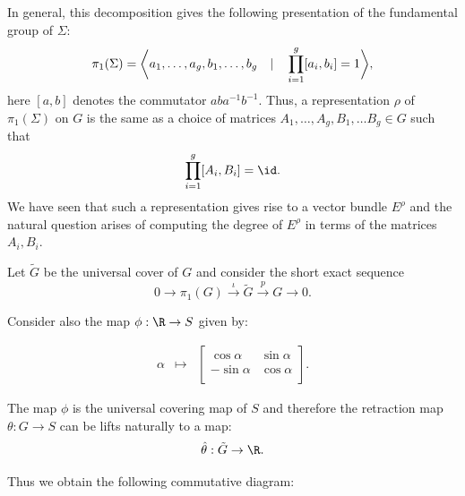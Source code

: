 In general, this decomposition gives the following presentation of the fundamental group of $\Sigma$:
\[\pi_1(\Sigma)=\bigg{\langle} a_1,\dots, a_g, b_1, \dots, b_g \quad | \quad \prod_{i=1}^g [a_i,b_i]=1 \bigg{\rangle}, \]
here $[a,b]$ denotes the commutator $aba^{-1}b^{-1}$. Thus, a representation $\rho$ of $\pi_1(\Sigma)$ on $G$ is the same as a choice of matrices
$A_1,\dots,A_g,B_1, \dots B_g \in G$ such that \[\prod_{i=1}^g [A_i,B_i]=\id.\]
We have seen that such a representation gives rise to a vector bundle $E^\rho$ and the natural question arises of computing the degree of $E^\rho$ in terms of
the matrices $A_i, B_i$.


Let $\tilde{G}$ be the universal cover of $G$ and consider the short exact sequence  
\[0 \rightarrow \pi_1(G) \xrightarrow{\iota} \tilde{G} \xrightarrow{p} G \rightarrow 0.\]

Consider also the map $\phi: \R \rightarrow S$ given by:

$$\begin{array}{rcc}
\alpha & \longmapsto & \left[ {\begin{array}{cc}
	\cos \alpha & \sin \alpha\\
	-\sin \alpha & \cos \alpha \\
	\end{array} }  \right] .
\end{array}$$

The map $\phi$ is the universal covering map of $S$ and therefore the retraction map $\theta: G \rightarrow S$ can be lifts naturally to a map:
\[ \hat{\theta}: \tilde{G} \rightarrow \R.\]

Thus we obtain the following commutative diagram:
\begin{center}
\end{center}


